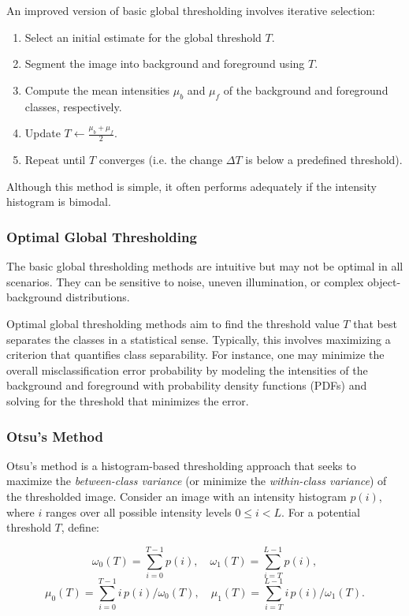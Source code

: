 \documentclass[a4paper,12pt]{article}
\begin{document}
An improved version of basic global thresholding involves iterative selection:
\begin{enumerate}
    \item Select an initial estimate for the global threshold \(T\).
    \item Segment the image into background and foreground using \(T\).
    \item Compute the mean intensities \(\mu_b\) and \(\mu_f\) of the background and foreground classes, respectively.
    \item Update \(T \leftarrow \frac{\mu_b + \mu_f}{2}\).
    \item Repeat until \(T\) converges (i.e. the change \(\Delta T\) is below a predefined threshold).
\end{enumerate}

Although this method is simple, it often performs adequately if the intensity histogram is bimodal.

\subsubsection{Optimal Global Thresholding}

The basic global thresholding methods are intuitive but may not be optimal in all scenarios. They can be sensitive to noise, uneven illumination, or complex object-background distributions.

Optimal global thresholding methods aim to find the threshold value \(T\) that best separates the classes in a statistical sense. Typically, this involves maximizing a criterion that quantifies class separability. For instance, one may minimize the overall misclassification error probability by modeling the intensities of the background and foreground with probability density functions (PDFs) and solving for the threshold that minimizes the error.

\subsubsection{Otsu's Method}

Otsu's method is a histogram-based thresholding approach that seeks to maximize the \emph{between-class variance} (or minimize the \emph{within-class variance}) of the thresholded image. Consider an image with an intensity histogram \(p(i)\), where \(i\) ranges over all possible intensity levels \(0 \leq i < L\). For a potential threshold \(T\), define:

\[
\omega_0(T) = \sum_{i=0}^{T-1} p(i), 
\quad
\omega_1(T) = \sum_{i=T}^{L-1} p(i),
\]
\[
\mu_0(T) = \sum_{i=0}^{T-1} i \, p(i) / \omega_0(T), 
\quad
\mu_1(T) = \sum_{i=T}^{L-1} i \, p(i) / \omega_1(T).
\]
\end{document}
